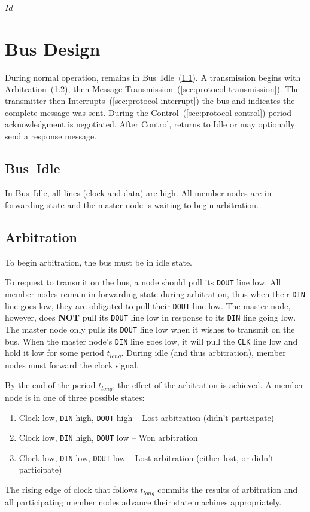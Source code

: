 \svnInfo $Id$

\section{Bus Design}
\label{sec:protocol}
During normal operation, \bus remains in Bus~Idle~(\ref{sec:protocol-idle}).
A transmission begins with Arbitration~(\ref{sec:protocol-arbitration}), then
Message Transmission~(\ref{sec:protocol-transmission}). The transmitter then
Interrupts~(\ref{sec:protocol-interrupt}) the bus and indicates the complete
message was sent. During the Control~(\ref{sec:protocol-control}) period
acknowledgment is negotiated. After Control, \bus returns to Idle or may
optionally send a response message.

\begin{figure}[h!]
  \figTimingArbitration
\end{figure}

\subsection{Bus~Idle}
\label{sec:protocol-idle}
In \bus Bus~Idle, all lines (clock and data) are high. All member nodes are in
forwarding state and the master node is waiting to begin arbitration.

\subsection{Arbitration}
\label{sec:protocol-arbitration}
To begin arbitration, the bus must be in idle state.

To request to transmit on the bus, a node should pull its {\tt DOUT} line low.
All member nodes remain in forwarding state during arbitration, thus when
their {\tt DIN} line goes low, they are obligated to pull their {\tt DOUT}
line low. The master node, however, does {\bf NOT} pull its {\tt DOUT} line
low in response to its {\tt DIN} line going low. The master node only pulls
its {\tt DOUT} line low when it wishes to transmit on the bus. When the
master node's {\tt DIN} line goes low, it will pull the {\tt CLK} line low
and hold it low for some period $t_{long}$. During {\sc idle} (and thus
arbitration), member nodes must forward the clock signal.

By the end of the period $t_{long}$, the effect of the arbitration is
achieved. A member node is in one of three possible states:
\begin{enumerate}
  \item Clock low, {\tt DIN} high, {\tt DOUT} high -- Lost arbitration
    (didn't participate)
  \item Clock low, {\tt DIN} high, {\tt DOUT} low -- Won arbitration
  \item Clock low, {\tt DIN} low, {\tt DOUT} low -- Lost arbitration
    (either lost, or didn't participate)
\end{enumerate}
The rising edge of clock that follows $t_{long}$ commits the results of
arbitration and all participating member nodes advance their state machines
appropriately.

